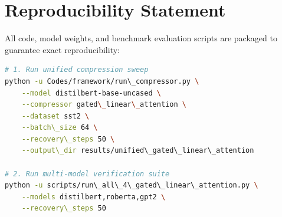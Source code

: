 \section{Reproducibility Statement}
All code, model weights, and benchmark evaluation scripts are packaged to guarantee exact reproducibility:
\begin{lstlisting}[language=bash]
# 1. Run unified compression sweep
python -u Codes/framework/run\_compressor.py \
    --model distilbert-base-uncased \
    --compressor gated\_linear\_attention \
    --dataset sst2 \
    --batch\_size 64 \
    --recovery\_steps 50 \
    --output\_dir results/unified\_gated\_linear\_attention

# 2. Run multi-model verification suite
python -u scripts/run\_all\_4\_gated\_linear\_attention.py \
    --models distilbert,roberta,gpt2 \
    --recovery\_steps 50
\end{lstlisting}
